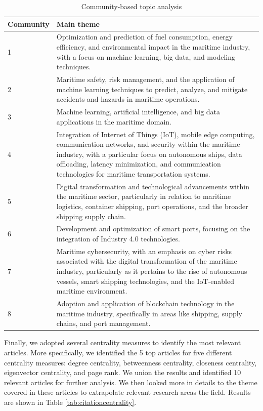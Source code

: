 \documentclass[a4paper, review, endfloat, doubleblind, authoryear]{elsarticle}
\begin{document}
	\begin{table}[h]
		\centering
		\caption{Community-based topic analysis}
		\begin{tabularx}{\linewidth}{p{2cm}X}
			\hline
			Community & Main theme \\
			\hline
			1 & Optimization and prediction of fuel consumption, energy efficiency, and environmental impact in the maritime industry, with a focus on machine learning, big data, and modeling techniques.\\
			2 & Maritime safety, risk management, and the application of machine learning techniques to predict, analyze, and mitigate accidents and hazards in maritime operations. \\
			3 & Machine learning, artificial intelligence, and big data applications in the maritime domain.\\
			4 & Integration of Internet of Things (IoT), mobile edge computing, communication networks, and security within the maritime industry, with a particular focus on autonomous ships, data offloading, latency minimization, and communication technologies for maritime transportation systems.\\
			5 & Digital transformation and technological advancements within the maritime sector, particularly in relation to maritime logistics, container shipping, port operations, and the broader shipping supply chain.\\
			6 & Development and optimization of smart ports, focusing on the integration of Industry 4.0 technologies.\\
			7 & Maritime cybersecurity, with an emphasis on cyber risks associated with the digital transformation of the maritime industry, particularly as it pertains to the rise of autonomous vessels, smart shipping technologies, and the IoT-enabled maritime environment.\\
			8 & Adoption and application of blockchain technology in the maritime industry, specifically in areas like shipping, supply chains, and port management.\\
			\hline
		\end{tabularx}
		\label{tab:citationthemes}
	\end{table}
	
	Finally, we adopted several centrality measures to identify the most relevant articles. More specifically, we identified the 5 top articles for five different centrality measures: degree centrality, betweenness centrality, closeness centrality, eigenvector centrality, and page rank. We union the results and identified 10 relevant articles for further analysis. We then looked more in details to the theme covered in these articles to extrapolate relevant research areas the field. Results are shown in Table \ref{tab:citationcentrality}.
	
\end{document}
